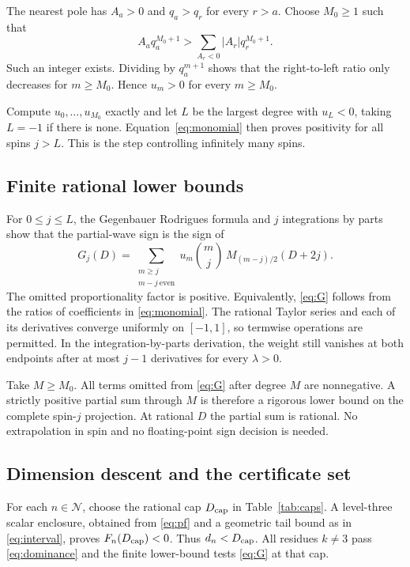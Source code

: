 \documentclass[11pt,a4paper]{article}
\theoremstyle{remark}\newtheorem{remark}[theorem]{Remark}
\newcommand{\cset}{\mathcal N}
\begin{document}
The nearest pole has $A_a>0$ and $q_a>q_r$ for every $r>a$. Choose $M_0\geq1$ such that
\begin{equation}\label{eq:dominance}
 A_aq_a^{M_0+1}>\sum_{A_r<0}|A_r|q_r^{M_0+1}.
\end{equation}
Such an integer exists. Dividing by $q_a^{m+1}$ shows that the right-to-left ratio only decreases for $m\geq M_0$. Hence $u_m>0$ for every $m\geq M_0$.

Compute $u_0,\ldots,u_{M_0}$ exactly and let $L$ be the largest degree with $u_L<0$, taking $L=-1$ if there is none. Equation~\eqref{eq:monomial} then proves positivity for all spins $j>L$. This is the step controlling infinitely many spins.

\subsection{Finite rational lower bounds}
For $0\leq j\leq L$, the Gegenbauer Rodrigues formula and $j$ integrations by parts show that the partial-wave sign is the sign of
\begin{equation}\label{eq:G}
 G_j(D)=\sum_{\substack{m\geq j\\m-j\ \mathrm{even}}}
 u_m\binom mj\,M_{(m-j)/2}(D+2j).
\end{equation}
The omitted proportionality factor is positive. Equivalently, \eqref{eq:G} follows from the ratios of coefficients in \eqref{eq:monomial}. The rational Taylor series and each of its derivatives converge uniformly on $[-1,1]$, so termwise operations are permitted. In the integration-by-parts derivation, the weight still vanishes at both endpoints after at most $j-1$ derivatives for every $\lambda>0$.

Take $M\geq M_0$. All terms omitted from \eqref{eq:G} after degree $M$ are nonnegative. A strictly positive partial sum through $M$ is therefore a rigorous lower bound on the complete spin-$j$ projection. At rational $D$ the partial sum is rational. No extrapolation in spin and no floating-point sign decision is needed.

\subsection{Dimension descent and the certificate set}
For each $n\in\cset$, choose the rational cap $D_{\rm cap}$ in Table~\ref{tab:caps}. A level-three scalar enclosure, obtained from \eqref{eq:pf} and a geometric tail bound as in \eqref{eq:interval}, proves $F_n(D_{\rm cap})<0$. Thus $d_n<D_{\rm cap}$. All residues $k\neq3$ pass \eqref{eq:dominance} and the finite lower-bound tests \eqref{eq:G} at that cap.
\end{document}
